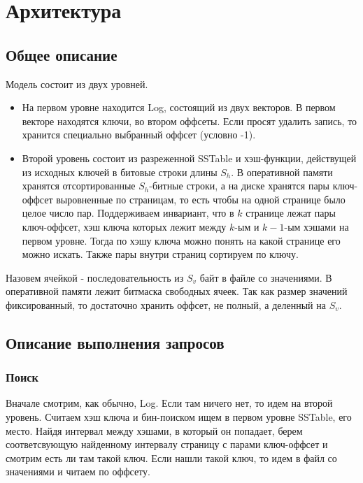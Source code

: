 \section*{Архитектура}
  \subsection*{Общее описание}
      Модель состоит из двух уровней. 
      \begin{itemize} 
      \item 
        На первом уровне находится Log, состоящий из двух векторов. В первом векторе находятся ключи, во втором оффсеты. Если просят удалить запись, то хранится специально выбранный оффсет (условно -1).
      \item
        Второй уровень состоит из разреженной SSTable и хэш-функции, действущей из исходных ключей в битовые строки длины $S_h$.
        В оперативной памяти хранятся отсортированные $S_h$-битные строки, а на диске хранятся пары ключ-оффсет выровненные по страницам, 
        то есть чтобы на одной странице было целое число пар. Поддерживаем инвариант, что в $k$ странице лежат пары ключ-оффсет, хэш ключа которых лежит между $k$-ым и $k-1$-ым хэшами на первом уровне. 
        Тогда по хэшу ключа можно понять на какой странице его можно искать. Также пары внутри страниц сортируем по ключу.
      \end{itemize}

      Назовем ячейкой - последовательность из $S_v$ байт в файле со значениями. В оперативной памяти лежит битмаска свободных ячеек. 
      Так как размер значений фиксированный, то достаточно хранить оффсет, не полный, а деленный на $S_v$.

    \subsection*{Описание выполнения запросов}
      \subsubsection*{Поиск}
        Вначале смотрим, как обычно, Log. Если там ничего нет, то идем на второй уровень. 
        Считаем хэш ключа и бин-поиском ищем в первом уровне SSTable, его место. 
        Найдя интервал между хэшами, в который он попадает, берем соответсвующую найденному интервалу страницу с парами ключ-оффсет и смотрим есть ли там такой ключ. 
        Если нашли такой ключ, то идем в файл со значениями и читаем по оффсету.

